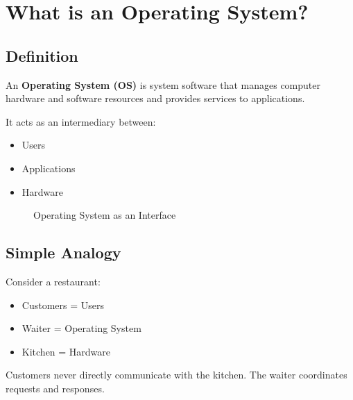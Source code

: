 \section{What is an Operating System?}

\subsection{Definition}

An \textbf{Operating System (OS)} is system software that manages computer hardware and software resources and provides services to applications.

It acts as an intermediary between:

\begin{itemize}
\item Users
\item Applications
\item Hardware
\end{itemize}

\begin{figure}[H]
\centering
{}
\caption{Operating System as an Interface}
\end{figure}

\subsection{Simple Analogy}

Consider a restaurant:

\begin{itemize}
\item Customers = Users
\item Waiter = Operating System
\item Kitchen = Hardware
\end{itemize}

Customers never directly communicate with the kitchen. The waiter coordinates requests and responses.

